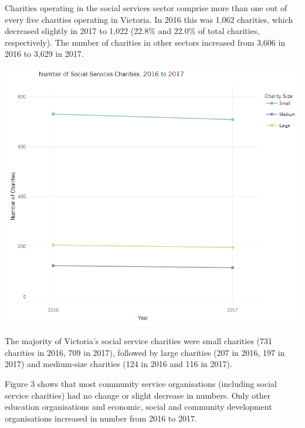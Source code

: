 \documentclass[
  11pt,
]{article}
\let\origfigure\figure
\let\endorigfigure\endfigure
\renewenvironment{figure}[1][2] {
    \expandafter\origfigure\expandafter[H]
} {
    \endorigfigure
}
\begin{document}
Charities operating in the social services sector comprise more than one out of every five charities operating in Victoria. In 2016 this was 1,062 charities, which decreased slightly in 2017 to 1,022 (22.8\% and 22.0\% of total charities, respectively). The number of charities in other sectors increased from 3,606 in 2016 to 3,629 in 2017.

\begin{figure}
\centering
\includegraphics{Fig2 SocServ Charity Size.png}
\caption{Count of Social Services Charities by Charity Size}
\end{figure}

The majority of Victoria's social service charities were small charities (731 charities in 2016, 709 in 2017), followed by large charities (207 in 2016, 197 in 2017) and medium-size charities (124 in 2016 and 116 in 2017).

Figure 3 shows that most community service organisations (including social service charities) had no change or slight decrease in numbers. Only other education organisations and economic, social and community development organisations increased in number from 2016 to 2017.
\end{document}
